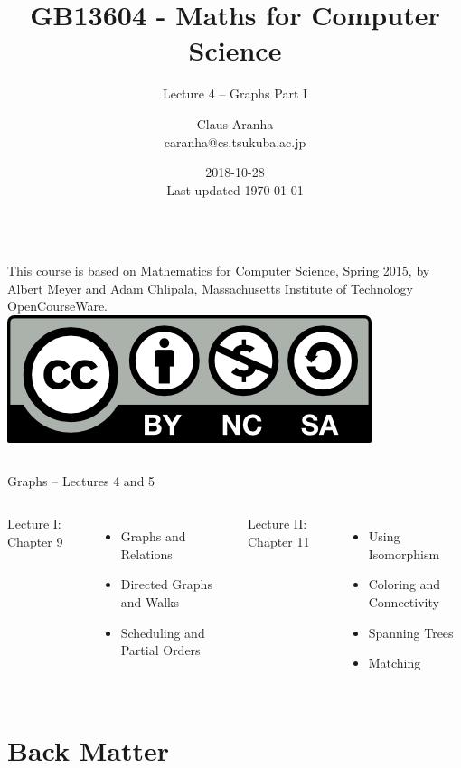 \documentclass[aspectratio=169]{beamer}
\title[GB13604]{GB13604 - Maths for Computer Science}
\subtitle[]{Lecture 4 -- Graphs Part I}
\author[Claus Aranha]{Claus Aranha\\{\footnotesize caranha@cs.tsukuba.ac.jp}}
\institute[COINS]{College of Information Science}
\date[2018-10-28]{2018-10-28\\{\tiny Last updated \today}}
\begin{document}
\begin{frame}
  \maketitle

  \begin{columns}
    {\smaller This course is based on Mathematics for Computer Science, Spring
    2015, by Albert Meyer and Adam Chlipala, Massachusetts Institute
    of Technology OpenCourseWare.}
    \includegraphics[width=\textwidth]{../img/by-nc-sa}
  \end{columns}
\end{frame}

\begin{frame}{Graphs -- Lectures 4 and 5}
  \begin{columns}
    \begin{center}
      Lecture I: Chapter 9
    \end{center}
    \begin{itemize}
      \item Graphs and Relations
      \item Directed Graphs and Walks
      \item Scheduling and Partial Orders
    \end{itemize}

    \begin{center}
      Lecture II: Chapter 11
    \end{center}
    \begin{itemize}
    \item Using Isomorphism
    \item Coloring and Connectivity
    \item Spanning Trees
    \item Matching
    \end{itemize}
  \end{columns}
\end{frame}






\section{Back Matter}

\end{document}
